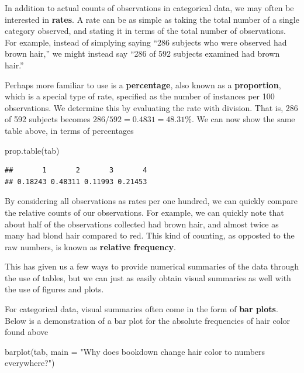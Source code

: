\documentclass[
]{book}
\newenvironment{Shaded}{\begin{snugshade}}{\end{snugshade}}
\newcommand{\AttributeTok}[1]{\textcolor[rgb]{0.77,0.63,0.00}{#1}}
\newcommand{\FunctionTok}[1]{\textcolor[rgb]{0.00,0.00,0.00}{#1}}
\newcommand{\NormalTok}[1]{#1}
\newcommand{\StringTok}[1]{\textcolor[rgb]{0.31,0.60,0.02}{#1}}
\theoremstyle{definition}
\theoremstyle{definition}
\theoremstyle{definition}
\theoremstyle{remark}
\begin{document}
In addition to actual counts of observations in categorical data, we may often be interested in \textbf{rates}. A rate can be as simple as taking the total number of a single category observed, and stating it in terms of the total number of observations. For example, instead of simplying saying ``286 subjects who were observed had brown hair,'' we might instead say ``286 of 592 subjects examined had brown hair.''

Perhaps more familiar to use is a \textbf{percentage}, also known as a \textbf{proportion}, which is a special type of rate, specified as the number of instances per 100 observations. We determine this by evaluating the rate with division. That is, 286 of 592 subjects becomes \(286/592 = 0.4831 = 48.31\%\). We can now show the same table above, in terms of percentages

\begin{Shaded}
\begin{Highlighting}[]
\FunctionTok{prop.table}\NormalTok{(tab)}
\end{Highlighting}
\end{Shaded}

\begin{verbatim}
##       1       2       3       4 
## 0.18243 0.48311 0.11993 0.21453
\end{verbatim}

By considering all observations as rates per one hundred, we can quickly compare the relative counts of our observations. For example, we can quickly note that about half of the observations collected had brown hair, and almost twice as many had blond hair compared to red. This kind of counting, as opposted to the raw numbers, is known as \textbf{relative frequency}.

This has given us a few ways to provide numerical summaries of the data through the use of tables, but we can just as easily obtain visual summaries as well with the use of figures and plots.

For categorical data, visual summaries often come in the form of \textbf{bar plots}. Below is a demonstration of a bar plot for the absolute frequencies of hair color found above

\begin{Shaded}
\begin{Highlighting}[]
\FunctionTok{barplot}\NormalTok{(tab, }\AttributeTok{main =} \StringTok{"Why does bookdown change hair color to numbers everywhere?"}\NormalTok{)}
\end{Highlighting}
\end{Shaded}
\end{document}
